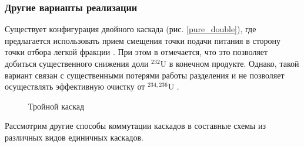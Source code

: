 \subsubsection{Другие варианты реализации}

Существует конфигурация двойного каскада (рис. \ref{pure_double}), где предлагается использовать прием смещения точки подачи питания в сторону точки отбора легкой фракции \cite{sulaberidzeProblemsRefinementRecycled4}. При этом в \cite{palkinReprocessedUraniumPurification2013} отмечается, что это позволяет добиться существенного снижения доли $^{232}$U в конечном продукте. Однако, такой вариант связан с существенными потерями работы разделения и не позволяет осуществлять эффективную очистку от $^{234,236}$U \cite{palkinPurificationReprocessedUranium2016}.
\begin{figure}[ht]
  \caption{Тройной каскад}\label{fig:pure_double}
\end{figure}

Рассмотрим другие способы коммутации каскадов в составные схемы из различных видов единичных каскадов.

